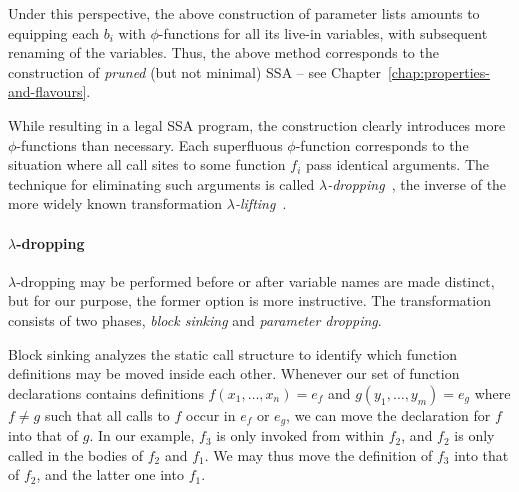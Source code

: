 Under this perspective, the above construction of parameter lists
amounts to equipping each $b_i$ with $\phi$-functions for all its
live-in variables, with subsequent renaming of the variables. Thus,
the above method corresponds to the construction of \emph{pruned} (but
not minimal) SSA -- see Chapter~\ref{chap:properties-and-flavours}.

While resulting in a legal SSA program, the construction clearly
introduces more $\phi$-functions than necessary. Each superfluous
$\phi$-function corresponds to the situation where all call sites to
some function $f_i$ pass identical arguments. The technique for
eliminating such arguments is called
\emph{$\lambda$-dropping}~\cite{DBLP:journals/tcs/DanvyS00}, the inverse of
the more widely known transformation
\emph{$\lambda$-lifting}~\cite{DBLP:conf/fpca/Johnsson85}.

\paragraph{$\lambda$-dropping}

$\lambda$-dropping may be performed before or after variable names are
made distinct, but for our purpose, the former option is more
instructive.  The transformation consists of two phases, \emph{block
sinking} and \emph{parameter dropping}.

Block sinking analyzes the static call structure to identify which
function definitions may be moved inside each other. Whenever our set
of function declarations contains definitions $f (x_1,\ldots,x_n) =
e_f$ and $ g (y_1,\ldots,y_m) = e_g$ where $f \neq g$ such that all
calls to $f$ occur in $e_f$ or $e_g$, we can move the declaration for
$f$ into that of $g$. In our example, $f_3$ is only invoked from
within $f_2$, and $f_2$ is only called in the bodies of $f_2$ and
$f_1$.  We may thus move the definition of $f_3$ into that of $f_2$,
and the latter one into $f_1$.

